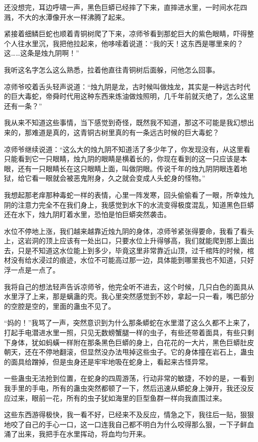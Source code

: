 还没想完，耳边呼啸一声，黑色巨蟒已经摔了下来，直摔进水里，一时间水花四溅，不大的水潭像开水一样沸腾了起来。

紧接着细鳞巨蛇也顺着青铜树爬了下来，凉师爷看到那蛇巨大的紫色眼睛，吓得整个人往水里沉，我把他拉起来，他哆嗦着说道：“我的天！这东西是哪里来的？这……这条是烛九阴啊！”

我听这名字怎么这么熟悉，拉着他直往青铜树后面躲，问他怎么回事。

凉师爷咬着舌头轻声说道：“烛九阴是龙，古时候叫做烛龙，其实是一种远古时代的巨大毒蛇，帝舜时代用这种东西来炼油做烛照明，几千年前就灭绝了，怎么这里还有一条？”

我从来不知道这些事情，当下感觉到奇怪，既然我不知道，那这不可能是我幻想出来的，那难道是真的，这青铜古树里真的有一条远古时候的巨大毒蛇？

凉师爷继续说道：“这么大的烛九阴不知道活了多少年了，你发现没有，从这里看只能看到它一只眼睛，烛九阴的眼睛是横着长的，你现在看到的这一只应该是本眼，还有一只眼睛长在这只眼睛上面，叫做阴眼。传说千年的烛九阴阴眼连着地狱，给它看一眼就会被恶鬼附身，久之就会变成人头蛇身的怪物。”

我想起那老痒那种毒蛇一样的表情，心里一阵发寒，回头偷偷看了一眼，所幸烛九阴的注意力完全不在我们身上，我感觉到水下的水流变得极度混乱，知道黑色巨蟒还在水下，烛九阴盯着水里，恐怕是怕巨蟒突然袭击。

水位不停地上涨，我们越来越靠近烛九阴的身体，凉师爷紧张得要命，我看了看头上，这岩洞的顶上应该有一处出口，只要水位上升得够高，我们就能爬到那上面出去，只是不知道这水位能上到多少，毕竟这里非常靠近山顶，过千棺阵的时候，棺材没有给水浸过的痕迹，水位不可能高过那一边，具体能到哪里我也不知道，只好浮一点是一点了。

我将自己的想法轻声告诉凉师爷，他完全听不进去，这个时候，几只白色的面具从水里浮了上来，那是螭蛊的壳。我心里突然感觉到不妙，拿起一只一看，嘴巴部分的空腔是空的，里面的蛊虫不见了。

“妈的！”我骂了一声，突然意识到为什么那条蟒蛇在水里潜了这么久都不上来了，打起手电潜进水里一照，只见无数螃蟹腿一样的虫子，有些还带着面具，有些只剩下身体，犹如蚂蟥一样附在那条黑色巨蟒的身上，白花花的一大片，黑色巨蟒肚皮朝天，还在不停地翻滚，但显然没办法甩掉这些虫子。它的身体撞在岩石上，蛊虫的面具给蹭掉，但是虫身还是牢牢地吸在蛇身上，看起来古怪异常。

一些蛊虫无法抢到位置，在蛇身的四周游荡，行动非常的敏捷，不妙的是，一看到我手里的手电，所有的蛊虫突然都顿了一下，然后迅速从蟒蛇身上弹开，我还没反应过来，眼前一花，所有的虫子犹如海里的巨型鱼群一样向我直围过来。

这些东西游得极快，我一看不好，已经来不及反应，情急之下，我往后一贴，狠狠地咬了自己的手心一口，这一口连我自己都不明白为什么咬得那么狠，一下子鲜血涌了出来，我把手在水里挥动，将血均匀开来。


